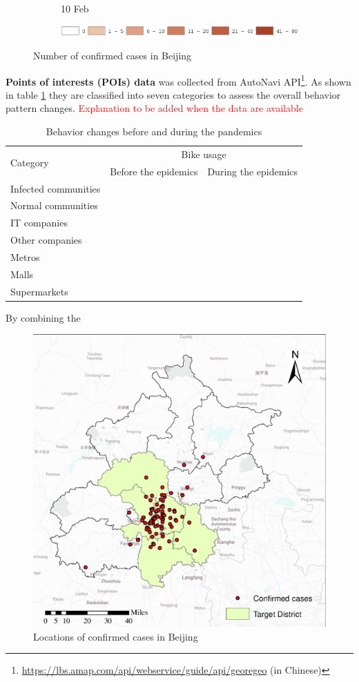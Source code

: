 \documentclass[preprints,ijgi,submit,moreauthors]{Definitions/mdpi}
\begin{document}
\begin{figure}[H]
\begin{subfigure}{.23\textwidth}
        \caption{10 Feb}
    \end{subfigure}
    \begin{subfigure}{0.7\textwidth}
        \includegraphics[width=\textwidth]{Figures/Fig2legend.eps}
    \end{subfigure}
    \caption{Number of confirmed cases in Beijing}
    \label{fig:number_of_confirmed_cases}
\end{figure}

\textbf{Points of interests (POIs) data} was collected from AutoNavi API\footnote{\url{https://lbs.amap.com/api/webservice/guide/api/georegeo} (in Chinese)}.
As shown in table \ref{tab:bike_usage} they are classified into seven categories to assess the overall behavior pattern changes.
\textcolor{red}{Explanation to be added when the data are available}

\begin{table}[H]
    \centering
    \begin{tabular}{|l|l|l|}
        \hline
        \multirow{2}{*}{Category} & \multicolumn{2}{c|}{Bike usage}\\
        \cline{2-3}
        & Before the epidemics & During the epidemics\\
        \hline
        Infected communities&&\\
        \hline
        Normal communities&&\\
        \hline
        IT companies&&\\
        \hline
        Other companies&&\\
        \hline
        Metros&&\\
        \hline
        Malls&&\\
        \hline
        Supermarkets&&\\
        \hline
    \end{tabular}
    \caption{Behavior changes before and during the pandemics}
    \label{tab:bike_usage}
\end{table}
By combining the
\begin{figure}[H]
    \centering
    \includegraphics[width=.5\textwidth]{Figures/Plot_location_confirmed_cases.eps}
    \caption{Locations of confirmed cases in Beijing}
    \label{fig:locations_of_confirmed_cases}
\end{figure} 
\end{document}
